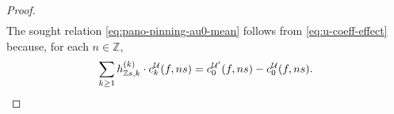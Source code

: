\documentclass[10pt,a4paper]{amsart}
\newcommand{\Z}{\mathbb{Z}} %
\begin{document}
\begin{proof}
\begin{multline}
\end{multline}The sought relation \eqref{eq:pano-pinning-au0-mean} follows from \eqref{eq:u-coeff-effect} because, for each $n\in\Z$, \[\sum_{k\geq 1}h^{(k)}_{\Z s,k}\cdot c^\mathcal{U}_k(f,ns)=c^{\mathcal{U}'}_0(f,ns)-c_0^\mathcal{U}(f,ns).\qedhere\]
\end{proof}
\end{document}
